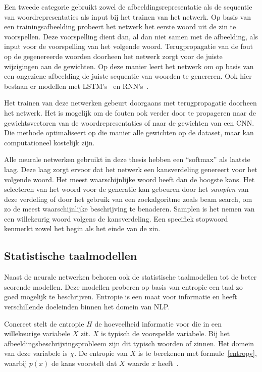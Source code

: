 Een tweede categorie gebruikt zowel de afbeeldingsrepresentatie als de sequentie van 
woordrepresentaties als input bij het trainen van het netwerk. Op basis van een trainingsafbeelding probeert het netwerk het eerste woord uit de zin te voorspellen. Deze voorspelling dient dan, al dan niet samen met de afbeelding, als input voor de voorspelling van het volgende woord. Terugpropagatie van de fout op de gegenereerde woorden doorheen het netwerk zorgt voor de juiste wijzigingen aan de gewichten. Op deze manier leert het netwerk om op basis van een ongeziene afbeelding de juiste sequentie van woorden te genereren. Ook hier bestaan er modellen met LSTM's~\cite{Donahue2015,Google,Xu2015} en RNN's~\cite{Karpathy2015,Mao2014a}.

Het trainen van deze netwerken gebeurt doorgaans met terugpropagatie doorheen het netwerk. Het is mogelijk om de fouten ook verder door te propageren naar de gewichtsvectoren van de woordrepresentaties of naar de gewichten van een CNN. Die methode optimaliseert op die manier alle gewichten op de dataset, maar kan computationeel kostelijk zijn.

Alle neurale netwerken gebruikt in deze thesis hebben een ``softmax'' als laatste laag. Deze laag zorgt ervoor dat het netwerk een kansverdeling genereert voor het volgende woord. Het meest waarschijnlijke woord heeft dan de hoogste kans.
Het selecteren van het woord voor de generatie kan gebeuren door het \emph{samplen} van deze verdeling of door het gebruik van een zoekalgoritme zoals beam search, om zo de meest waarschijnlijke beschrijving te benaderen. Samplen is het nemen van een willekeurig woord volgens de kansverdeling. Een specifiek stopwoord kenmerkt zowel het begin als het einde van de zin.

\subsection{Statistische taalmodellen}
Naast de neurale netwerken behoren ook de statistische taalmodellen tot de beter scorende modellen. Deze modellen proberen op basis van entropie een taal zo goed mogelijk te beschrijven. Entropie is een maat voor informatie en heeft verschillende doeleinden binnen het domein van NLP. 

Concreet stelt de entropie $H$ de hoeveelheid informatie voor die in een willekeurige variabele $X$ zit. $X$ is typisch de voorspelde variabele. Bij het afbeeldingsbeschrijvingsprobleem zijn dit typisch woorden of zinnen. Het domein van deze variabele is $\chi$. De entropie van $X$ is te berekenen met formule~\eqref{entropy}, waarbij $p(x)$ de kans voorstelt dat $X$ waarde $x$ heeft~\cite{Jurafsky:2009:SLP:1214993}. 

